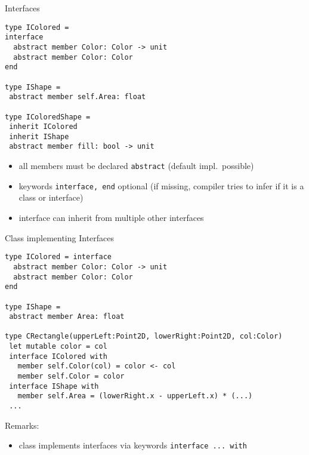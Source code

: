\documentclass{beamer}
\begin{document}
\begin{frame}[fragile]{Interfaces}
\begin{lstlisting}
type IColored =
interface
  abstract member Color: Color -> unit
  abstract member Color: Color
end 

type IShape =
 abstract member self.Area: float

type IColoredShape =
 inherit IColored
 inherit IShape
 abstract member fill: bool -> unit
\end{lstlisting}

\begin{overlayarea}{\textwidth}{0.3\textheight}
\begin{itemize}
\item<+-> all members must be declared \lstinline!abstract! (default
  impl.\ possible)
\item<+-> keywords \lstinline!interface, end! optional (if missing,
  compiler tries to infer if it is a class or interface)
\item<+-> interface can inherit from multiple other interfaces
\end{itemize}
\end{overlayarea}
\end{frame}

\begin{frame}[fragile]{Class implementing Interfaces}
\begin{lstlisting}[basicstyle=\scriptsize]
type IColored = interface
  abstract member Color: Color -> unit
  abstract member Color: Color
end 

type IShape =
 abstract member Area: float

type CRectangle(upperLeft:Point2D, lowerRight:Point2D, col:Color) 
 let mutable color = col
 interface IColored with
   member self.Color(col) = color <- col
   member self.Color = color
 interface IShape with
   member self.Area = (lowerRight.x - upperLeft.x) * (...)
 ...
\end{lstlisting}

Remarks:
\begin{overlayarea}{\textwidth}{0.3\textheight}
\begin{itemize}
\item<+-> class implements interfaces via keywords 
  \lstinline!interface ... with!
\end{itemize}
\end{overlayarea}
\end{frame}
\end{document}
